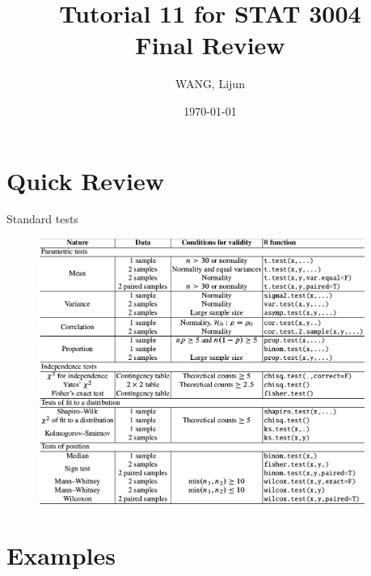 \documentclass{beamer}
\title{Tutorial 11 for STAT 3004\\Final Review}
\date{\today}
\author{WANG, Lijun}
\institute{Department of Statistics, CUHK}
\begin{document}
\maketitle

\section{Quick Review}

\begin{frame}{Standard tests}
\vspace{-8pt}
\begin{figure}
\centering
\includegraphics[width=0.95\textwidth]{standard-tests.png}
\end{figure}
\end{frame}

\section{Examples}
\end{document}
